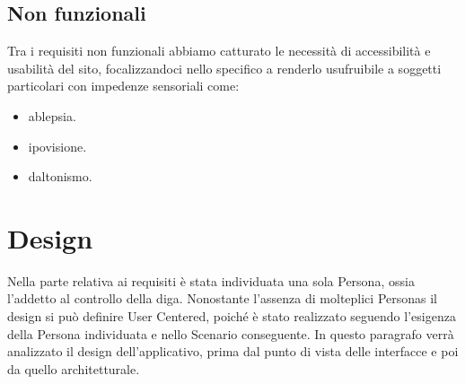 \documentclass[a4paper,12pt]{report}
\begin{document}
\section{Non funzionali}
Tra i requisiti non funzionali abbiamo catturato le necessità di accessibilità e usabilità del sito, focalizzandoci nello specifico a renderlo usufruibile a soggetti particolari con impedenze sensoriali come:
\begin{itemize}
	\item ablepsia.
	\item ipovisione.
	\item daltonismo.
\end{itemize}

\clearpage
\chapter{Design}\label{sec:design}
Nella parte relativa ai requisiti è stata individuata una sola Persona, ossia l'addetto al controllo della diga. Nonostante l'assenza di molteplici Personas il design si può definire User Centered, poiché è stato realizzato seguendo l'esigenza della Persona individuata e nello Scenario conseguente. In questo paragrafo verrà analizzato il design dell'applicativo, prima dal punto di vista delle interfacce e poi da quello architetturale. 
\\
\end{document}
